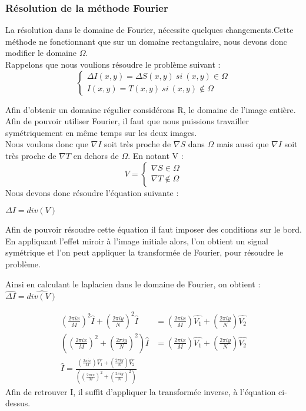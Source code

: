 \subsubsection{Résolution de la méthode Fourier}
La résolution dans le domaine de Fourier, nécessite quelques changements.Cette méthode ne fonctionnant que sur un domaine rectangulaire, nous devons donc modifier le domaine $\Omega$.\\
Rappelons que nous voulions résoudre le problème suivant :
\begin{equation}
\left\{
\begin{aligned}
\Delta I(x,y) = \Delta S(x,y) \ si \ (x,y) \in \Omega\\
I(x,y) = T(x,y) \ si \ (x,y) \notin \Omega
\end{aligned}
\right.
\end{equation}

Afin d'obtenir un domaine régulier considérons R, le domaine de l'image entière. Afin de pouvoir utiliser Fourier, il faut que nous puissions travailler symétriquement en même temps sur les deux images.\\
Nous voulons donc que $\nabla I$ soit très proche de $\nabla S$ dans $\Omega$ mais aussi que $\nabla I$ soit très proche de $\nabla T$ en dehors de $\Omega$. En notant V : 
\begin{equation}
V = 
\left\{
\begin{aligned}
\nabla S \in \Omega\\
\nabla T \notin \Omega
\end{aligned}
\right.
\end{equation}
Nous devons donc résoudre l'équation suivante : 
\begin{center}
$ \Delta I = div(V)$
\end{center}
Afin de pouvoir résoudre cette équation il faut imposer des conditions sur le bord. En appliquant l'effet miroir à l'image initiale alors, l'on obtient un signal symétrique  et l'on peut appliquer la transformée de Fourier, pour résoudre le problème. 

Ainsi en calculant le laplacien dans le domaine de Fourier, on obtient  : $\widehat{\Delta I} = \widehat{div(V)}$

\begin{equation}
\begin{aligned}
\left(\frac{2\pi i x}{M}\right)^2 \widehat{I}+\left(\frac{2\pi i y}{N}\right)^2 \widehat{I} & = \left(\frac{2\pi i x}{M}\right) \widehat{V_1}+\left(\frac{2\pi i y}{N}\right) \widehat{V_2}\\
\left(\left(\frac{2\pi i x}{M}\right)^2+\left(\frac{2\pi i y}{N}\right)^2\right) \widehat{I} & = \left(\frac{2\pi i x}{M}\right) \widehat{V_1}+\left(\frac{2\pi i y}{N}\right) \widehat{V_2}\\
\widehat{I} = \frac{\left(\frac{2\pi i x}{M}\right) \widehat{V_1}+\left(\frac{2\pi i y}{N}\right) \widehat{V_2}}{\left(\left(\frac{2\pi i x}{M}\right)^2+\left(\frac{2\pi i y}{N}\right)^2\right)}
\end{aligned}
\end{equation}
Afin de retrouver I, il suffit d'appliquer la transformée inverse, à l'équation ci-dessus.